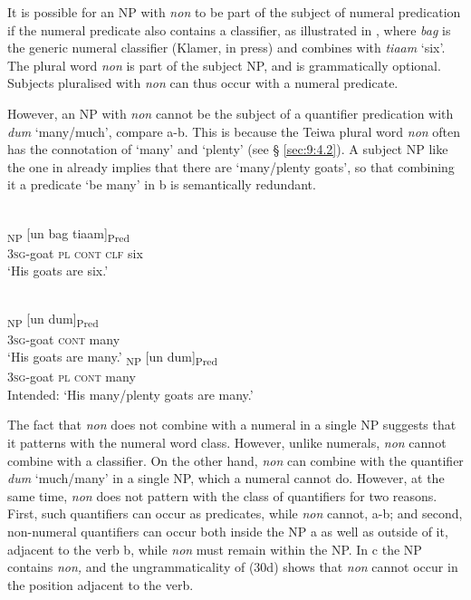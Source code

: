 It is possible for an NP with \textit{non} to be part of the subject of numeral predication if the numeral predicate also contains a classifier, as illustrated in , where \textit{bag} is the generic numeral classifier (Klamer, in press) and combines with \textit{tiaam} `six'. The plural word \textit{non} is part of the subject NP, and is grammatically optional. Subjects pluralised with \textit{non} can thus occur with a numeral predicate.

However, an NP with \textit{non} cannot be the subject of a quantifier predication with \textit{dum} `many/much', compare a-b. This is because the Teiwa plural word \textit{non} often has the connotation of `many' and `plenty' (see {\S} \ref{sec:9:4.2}). A subject NP like the one in  already implies that there are `many/plenty goats', so that combining it a predicate `be many' in b is semantically redundant.


\ea%
\label{ex:9:27}
 \\
\textsubscript{NP} [{un} bag {tiaam}]\textsubscript{Pred} \\
    \textsc{3sg}-goat \textsc{pl} \textsc{cont} \textsc{clf} six \\
\glt `His goats are six.'
\z







\ea%
\label{ex:9:28}
 \\
\ea
\gll [{Ga-qavif}] \textsubscript{NP} [un dum]\textsubscript{Pred}  \\
 \textsc{3sg}-goat \textsc{cont} many   \\
\glt `His goats are many.'
\ex
{}\textsubscript{NP} [un dum]\textsubscript{Pred}  \\
    \textsc{3sg}-goat \textsc{pl} \textsc{cont} many\\
\glt Intended: `His many/plenty goats are many.'
\z
\z






The fact that \textit{non} does not combine with a numeral in a single NP suggests that it patterns with the numeral word class. However, unlike numerals, \textit{non} cannot combine with a classifier. On the other hand, \textit{non} can combine with the quantifier \textit{dum} `much/many' in a single NP, which a numeral cannot do. However, at the same time, \textit{non} does not pattern with the class of quantifiers for two reasons. First, such quantifiers can occur as predicates, while \textit{non} cannot, a-b; and second, non-numeral quantifiers can occur both inside the NP a as well as outside of it, adjacent to the verb b, while \textit{non} must remain within the NP. In c the NP contains \textit{non,} and the ungrammaticality of (30d) shows that \textit{non} cannot occur in the position adjacent to the verb.


